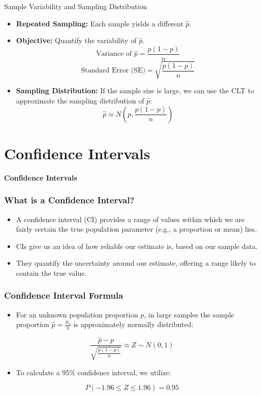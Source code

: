 \documentclass[handout]{beamer} %
\newcommand{\transitionslide}[1]{
    \begin{frame}[plain]
        \centering
        \vspace{1cm}
        \Huge
        \textcolor{moonstoneblue!150}{\textbf{#1}}
    \end{frame}
}
\begin{document}
\begin{frame}{Sample Variability and Sampling Distribution}
    \begin{itemize}
        \item \textbf{Repeated Sampling:} Each sample yields a different \( \hat{p} \).
        \item \textbf{Objective:} Quantify the variability of \( \hat{p} \).
    \[
        \text{Variance of } \hat{p} = \frac{p(1 - p)}{n}
    \]
    \[
        \text{Standard Error (SE)} = \sqrt{\frac{p(1 - p)}{n}}
    \]
     \item \textbf{Sampling Distribution:} If the sample size is large, we can use the CLT to approximate the sampling distribution of $\hat{p}$:
    \[
        \hat{p} \approx N\left(p, \frac{p(1-p)}{n}\right)
    \]
    \end{itemize}
\end{frame}

\section{Confidence Intervals}
\transitionslide{Confidence Intervals}

\begin{frame}
    \frametitle{What is a Confidence Interval?}
    \begin{itemize}
        \item A confidence interval (CI) provides a range of values within which we are fairly certain the true population parameter (e.g., a proportion or mean) lies.
        \item CIs give us an idea of how reliable our estimate is, based on our sample data.
        \item They quantify the uncertainty around our estimate, offering a range likely to contain the true value.
    \end{itemize}
\end{frame}

\begin{frame}
    \frametitle{Confidence Interval Formula}
    \begin{itemize}
        \item For an unknown population proportion \( p \), in large samples the sample proportion \( \hat{p} = \frac{S_n}{n} \) is approximately normally distributed:
    \end{itemize}
    \[
    \frac{\hat{p} - p}{\sqrt{\frac{p(1-p)}{n}}} \approx Z \sim N(0,1)
    \]
    \begin{itemize}
        \item To calculate a 95\% confidence interval, we utilize:
    \end{itemize}
    \[
    P(-1.96 \leq Z \leq 1.96) = 0.95
    \]
\end{frame}
\end{document}
